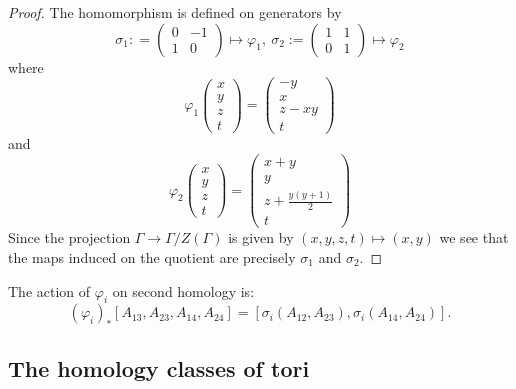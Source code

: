 \documentclass[11pt]{amsart}
\renewcommand{\phi}{\varphi}
\numberwithin{equation}{section}
\theoremstyle{definition}
\theoremstyle{remark}
\begin{document}
\begin{proof}
The homomorphism is defined on generators by
\[\sigma_1\colon =\left(\begin{array}{cc}
0 & -1\\
1 & 0
\end{array}\right)\mapsto\phi_1,\ \sigma_2:=\left(\begin{array}{cc}
1 & 1\\
0 & 1
\end{array}\right)\mapsto\phi_2\]
where
\[\phi_1\left(\begin{array}{c}
x\\
y\\
z\\
t
\end{array}\right)=\left(\begin{array}{c}
-y\\
x\\
z-xy\\
t
\end{array}\right)\]
and
\[\phi_2\left(\begin{array}{c}
x\\
y\\
z\\
t
\end{array}\right)=\left(\begin{array}{c}
x+y\\
y\\
z+\frac{y(y+1)}{2}\\
t
\end{array}\right)\]
Since the projection $\Gamma\to\Gamma/Z(\Gamma)$ is given by $(x,y,z,t)\mapsto(x,y)$ we see that the maps induced on the quotient are precisely $\sigma_1$ and $\sigma_2$.
\end{proof}
The action of $\phi_i$ on second homology is:
\begin{equation}\label{homologyaction}(\phi_i)_*[A_{13},A_{23},A_{14},A_{24}]=[\sigma_i(A_{12},A_{23}),\sigma_i(A_{14},A_{24})].\end{equation}


\subsection{The homology classes of tori}
\end{document}
